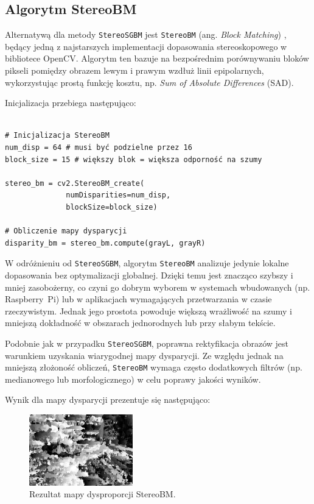 \documentclass[magisterska]{pracadypl}
\begin{document}
\subsection*{Algorytm StereoBM}

Alternatywą dla metody \texttt{StereoSGBM} jest \texttt{StereoBM} (ang. \textit{Block Matching}) \cite{bm}, będący jedną z najstarszych implementacji dopasowania stereoskopowego w bibliotece OpenCV. Algorytm ten bazuje na bezpośrednim porównywaniu bloków pikseli pomiędzy obrazem lewym i prawym wzdłuż linii epipolarnych, wykorzystując prostą funkcję kosztu, np. \textit{Sum of Absolute Differences} (SAD).

Inicjalizacja przebiega następująco:

\begin{lstlisting}[style=mypython]

# Inicjalizacja StereoBM
num_disp = 64 # musi być podzielne przez 16
block_size = 15 # większy blok = większa odporność na szumy

stereo_bm = cv2.StereoBM_create(
              numDisparities=num_disp,
              blockSize=block_size)

# Obliczenie mapy dysparycji
disparity_bm = stereo_bm.compute(grayL, grayR)
\end{lstlisting}

W odróżnieniu od \texttt{StereoSGBM}, algorytm \texttt{StereoBM} analizuje jedynie lokalne dopasowania bez optymalizacji globalnej. Dzięki temu jest znacząco szybszy i mniej zasobożerny, co czyni go dobrym wyborem w systemach wbudowanych (np. Raspberry~Pi) lub w aplikacjach wymagających przetwarzania w czasie rzeczywistym. Jednak jego prostota powoduje większą wrażliwość na szumy i mniejszą dokładność w obszarach jednorodnych lub przy słabym tekście.

Podobnie jak w przypadku \texttt{StereoSGBM}, poprawna rektyfikacja obrazów jest warunkiem uzyskania wiarygodnej mapy dysparycji. Ze względu jednak na mniejszą złożoność obliczeń, \texttt{StereoBM} wymaga często dodatkowych filtrów (np. medianowego lub morfologicznego) w celu poprawy jakości wyników.

Wynik dla mapy dysparycji prezentuje się następująco:

\begin{figure}[H]  %
    \centering  %
    \includegraphics[width=0.4\textwidth]{images/BMdisparity.png}  %
    \captionsetup{font=footnotesize}
    \caption[Rezultat mapy dysproporcji StereoBM. Opracowanie własne.]{Rezultat mapy dysproporcji StereoBM.}
\end{figure}
\end{document}

